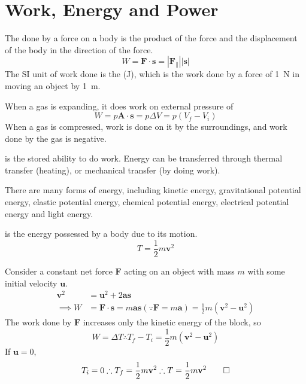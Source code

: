\documentclass[Physics.tex]{subfiles}
\begin{document}
\chapter{Work, Energy and Power}
The  done by a force on a body is the product of the force and the displacement of the body in the direction of the force. \begin{equation}W = \mathbf{F}\cdot\mathbf{s} = \left|\mathbf{F}_\parallel\right|\left|\mathbf{s}\right|\end{equation} The SI unit of work done is the  (\si{\joule}), which is the work done by a force of \SI{1}{\newton} in moving an object by \SI{1}{\metre}.

When a gas is expanding, it does work on external pressure of
\begin{equation}W = p\mathbf{A}\cdot\mathbf{s} = p\Delta V = p(V_f - V_i)\end{equation} When a gas is compressed, work is done on it by the surroundings, and work done by the gas is negative.

 is the stored ability to do work. Energy can be transferred through thermal transfer (heating), or mechanical transfer (by doing work).

There are many forms of energy, including kinetic energy, gravitational potential energy, elastic potential energy, chemical potential energy, electrical potential energy and light energy.

 is the energy possessed by a body due to its motion. \begin{equation}T = \frac{1}{2}m\mathbf{v}^2\end{equation}

\begin{slderiv}Consider a constant net force \(\mathbf{F}\) acting on an object with mass \(m\) with some initial velocity \(\mathbf{u}\). \begin{equation*}\begin{split}\mathbf{v}^2 &= \mathbf{u}^2 + 2\mathbf{a}\mathbf{s}\\\implies W &= \mathbf{F}\cdot\mathbf{s} = m\mathbf{as} \mathrel(\mathrel\because\mathbf{F} = m\mathbf{a}) = \frac{1}{2}m(\mathbf{v}^2 - \mathbf{u}^2)\end{split}\end{equation*} The work done by \(\mathbf{F}\) increases only the kinetic energy of the block, so \[W = \Delta T \mathrel\therefore T_f - T_i = \frac{1}{2}m(\mathbf{v}^2 - \mathbf{u}^2)\] If \(\mathbf{u} = 0\), \[T_i = 0 \mathrel\therefore T_f = \frac{1}{2}m\mathbf{v}^2 \mathrel\therefore T = \frac{1}{2}m\mathbf{v}^2\qedhere\]\end{slderiv}
\end{document}
